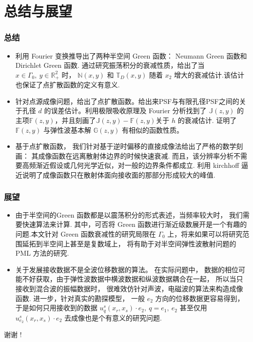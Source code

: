 \documentclass[8pt]{beamer}
\newcommand{\R}{\mathbb{R}}
\newcommand{\Ga}{\Gamma}
\newcommand{\N}{\mathbb{N}}
\newcommand{\T}{\mathbb{T}}
\renewcommand{\G}{\mathbb{G}}
\newcommand{\F}{\mathbb{F}}
\newcommand{\J}{\mathbb{J}}
\begin{document}
\section{总结与展望}
\begin{frame}
\frametitle{总结}
\begin{itemize}
\item 利用 Fourier 变换推导出了两种半空间 Green 函数： Neumann Green 函数和 Dirichlet Green 函数. 通过研究振荡积分的衰减性质，给出了当 $x\in \Ga_0, \ y\in \R^2_+$ 时， $\N(x,y)$ 和 $\T_D(x,y)$ 随着 $x_2$ 增大的衰减估计.该估计也保证了点扩散函数的定义有意义.
\vspace{.25cm}
\item 针对点源成像问题，给出了点扩散函数。给出来PSF与有限孔径PSF之间的关于孔径 $d$ 的误差估计。利用极限吸收原理及 Fourier 分析找到了 $\J(z,y)$ 的主项$\F(z,y)$，并且刻画了$\J(z,y)-\F(z,y)$关于 $h$ 的衰减估计. 证明了 $\F(z,y)$ 与弹性波基本解 $\G(z,y)$ 有相似的函数性质。
\vspace{0.25cm}
\item 基于点扩散函数， 我们针对基于逆时偏移的直接成像法给出了严格的数学刻画： 其成像函数在远离散射体边界的时候快速衰减. 而且，该分辨率分析不需要高频渐近假设或几何光学近似，对一般的边界条件都成立. 利用 kirchhoff 逼近说明了成像函数只在散射体面向接收面的那部分形成较大的峰值.
\end{itemize}
\end{frame}
\begin{frame}
\frametitle{展望}
\begin{itemize}
	\item 由于半空间的Green 函数都是以震荡积分的形式表述，当频率较大时， 我们需要快速算法来计算. 其中，可否将 Green 函数进行渐近级数展开是一个有趣的问题.本文针对 Green 函数衰减性的研究局限在 $\Ga_0$ 上，将来如果可以将研究范围延拓到半空间上甚至是复数域上， 将有助于对半空间弹性波散射问题的 PML 方法的研究.
	\vspace{.25cm}
	\item 关于发展接收数据不是全波位移数据的算法。
	在实际问题中， 数据的相位可能不好获取，由于弹性波数据中横波数据和纵波数据耦合在一起， 所以当只接收到混合波的振幅数据时， 很难效仿针对声波，电磁波的算法来构造成像函数. 进一步，针对真实的勘探模型， 一般 $e_2$ 方向的位移数据更容易得到， 于是如何只用接收到的数据 $u^s_q(x_r,x_s)\cdot e_2, \ q=e_1, \ e_2$ 甚至仅用 $u^s_{e_2}(x_r,x_s)\cdot e_2$ 去成像也是个有意义的研究问题.
\end{itemize}
\pause
\vspace{1cm}
\begin{flushright}
	\LARGE \textcolor[rgb]{1.00,0.00,0.00}{谢谢 !}
\end{flushright}
\end{frame}
\end{document}
